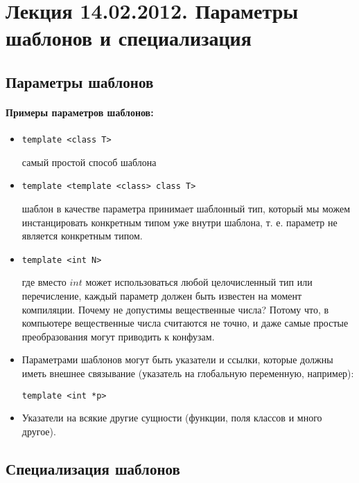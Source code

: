 \section{Лекция 14.02.2012. Параметры шаблонов и специализация}

\subsection{Параметры шаблонов}

\paragraph{Примеры параметров шаблонов:}
\begin{itemize}
\item
\begin{lstlisting}
template <class T>
\end{lstlisting}
самый простой способ шаблона

\item
\begin{lstlisting}
template <template <class> class T>
\end{lstlisting}
шаблон в качестве параметра принимает шаблонный тип, который мы можем инстанцировать конкретным типом уже внутри шаблона, т. е. параметр не является конкретным
типом.

\item
\begin{lstlisting}
template <int N>
\end{lstlisting}
где вместо $int$ может использоваться любой целочисленный тип или перечисление, каждый параметр должен быть известен на момент компиляции. Почему не допустимы
вещественные числа? Потому что, в компьютере вещественные числа считаются не точно, и даже самые простые преобразования могут приводить к конфузам.

\item Параметрами шаблонов могут быть указатели и ссылки, которые должны иметь внешнее связывание (указатель на глобальную переменную, например):
\begin{lstlisting}
template <int *p>
\end{lstlisting}

\item Указатели на всякие другие сущности (функции, поля классов и много другое).
\end{itemize}

\subsection{Специализация шаблонов}

